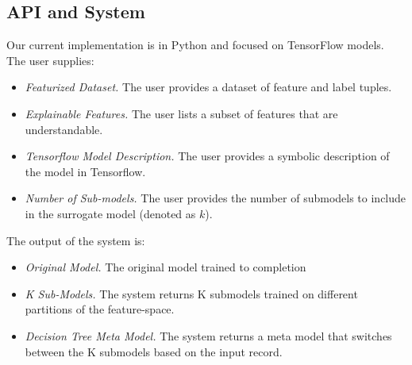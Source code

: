 \subsection{API and System}
Our current implementation is in Python and focused on TensorFlow models.  The user supplies:
\begin{itemize}
\item \emph{Featurized Dataset. } The user provides a dataset of feature and label tuples.

\item \emph{Explainable Features. } The user lists a subset of features that are understandable.

\item \emph{Tensorflow Model Description. } The user provides a symbolic description of the model in Tensorflow.

\item \emph{Number of Sub-models. } The user provides the number of submodels to include in the surrogate model (denoted as $k$).
\end{itemize}

The output of the system is:
\begin{itemize}
\item \emph{Original Model. } The original model trained to completion

\item \emph{K Sub-Models. } The system returns K submodels trained on different partitions of the feature-space.

\item \emph{Decision Tree Meta Model. } The system returns a meta model that switches between the K submodels based on the input record.
\end{itemize}

